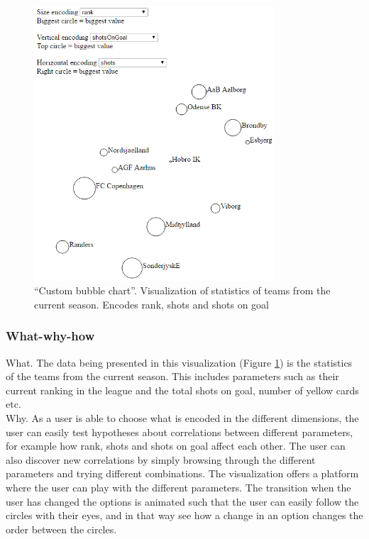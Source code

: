 \documentclass[Report.tex]{subfiles}
\begin{document}
\begin{figure}
\center
\includegraphics[width=0.8\textwidth]{"Figures/bubble_chart"}
\caption{``Custom bubble chart''. Visualization of statistics of teams from the current season. Encodes rank, shots and shots on goal}
\label{Fig:Bubbleviz}
\end{figure}

\subsubsection{What-why-how}
What. The data being presented in this visualization (Figure \ref{Fig:Bubbleviz}) is the statistics of the teams from the current season. This includes parameters such as their current ranking in the league and the total shots on goal, number of yellow cards etc.\\

\noindent Why. As a user is able to choose what is encoded in the different dimensions, the user can easily test hypotheses about correlations between different parameters, for example how rank, shots and shots on goal affect each other. The user can also discover new correlations by simply browsing through the different parameters and trying different combinations. The visualization offers a platform where the user can play with the different parameters. The transition when the user has changed the options is animated such that the user can easily follow the circles with their eyes, and in that way see how a change in an option changes the order between the circles.\\
\end{document}
